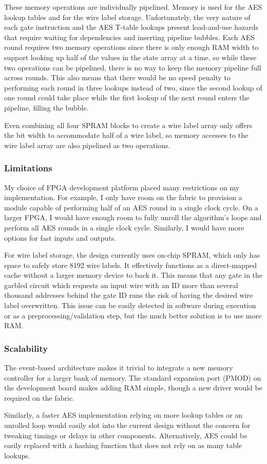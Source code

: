 These memory operations are individually pipelined. Memory is used for the AES lookup tables and for the wire label storage. Unfortunately, the very nature of each gate instruction and the AES T-table lookups present load-and-use hazards that require waiting for dependencies and inserting pipeline bubbles. Each AES round requires two memory operations since there is only enough RAM width to support looking up half of the values in the state array at a time, so while these two operations can be pipelined, there is no way to keep the memory pipeline full across rounds. This also means that there would be no speed penalty to performing each round in three lookups instead of two, since the second lookup of one round could take place while the first lookup of the next round enters the pipeline, filling the bubble.

Even combining all four SPRAM blocks to create a wire label array only offers the bit width to accommodate half of a wire label, so memory accesses to the wire label array are also pipelined as two operations.

\subsubsection{Limitations}
My choice of FPGA development platform placed many restrictions on my implementation. For example, I only have room on the fabric to provision a module capable of performing half of an AES round in a single clock cycle. On a larger FPGA, I would have enough room to fully unroll the algorithm's loops and perform all AES rounds in a single clock cycle. Similarly, I would have more options for fast inputs and outputs.

For wire label storage, the design currently uses on-chip SPRAM, which only has space to safely store 8192 wire labels. It effectively functions as a direct-mapped cache without a larger memory device to back it. This means that any gate in the garbled circuit which requests an input wire with an ID more than several thousand addresses behind the gate ID runs the risk of having the desired wire label overwritten. This issue can be easily detected in software during execution or as a preprocessing/validation step, but the much better solution is to use more RAM.

\subsubsection{Scalability}
The event-based architecture makes it trivial to integrate a new memory controller for a larger bank of memory. The standard expansion port (PMOD) on the development board makes adding RAM simple, though a new driver would be required on the fabric.

Similarly, a faster AES implementation relying on more lookup tables or an unrolled loop would easily slot into the current design without the concern for tweaking timings or delays in other components. Alternatively, AES could be easily replaced with a hashing function that does not rely on as many table lookups.
